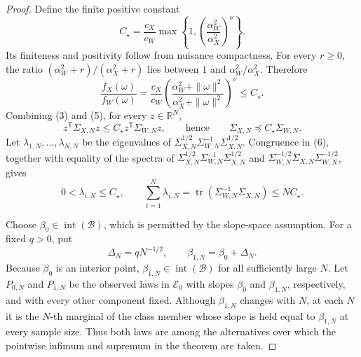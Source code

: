 \documentclass{article}
\begin{document}
\begin{proof}
Define the finite positive constant
\[
 C_\star=\frac{c_X}{c_W}
 \max\left\{1,\left(\frac{\alpha_W^2}{\alpha_X^2}\right)^\nu\right\}.
 \tag{4}
\]
Its finiteness and positivity follow from nuisance compactness.  For every \(r\geq0\), the ratio \((\alpha_W^2+r)/(\alpha_X^2+r)\) lies between \(1\) and \(\alpha_W^2/\alpha_X^2\).  Therefore
\[
 \frac{f_X(\omega)}{f_W(\omega)}
 =\frac{c_X}{c_W}
 \left(\frac{\alpha_W^2+\|\omega\|^2}
 {\alpha_X^2+\|\omega\|^2}\right)^\nu
 \leq C_\star.
 \tag{5}
\]
Combining (3) and (5), for every \(z\in\mathbb R^N\),
\[
 z^{\mathsf T}\Sigma_{X,N}z
 \leq C_\star z^{\mathsf T}\Sigma_{W,N}z,
 \qquad\text{hence}\qquad
 \Sigma_{X,N}\preceq C_\star\Sigma_{W,N}.
 \tag{6}
\]
Let \(\lambda_{1,N},\ldots,\lambda_{N,N}\) be the eigenvalues of \(\Sigma_{X,N}^{1/2}\Sigma_{W,N}^{-1}\Sigma_{X,N}^{1/2}\).  Congruence in (6), together with equality of the spectra of \(\Sigma_{X,N}^{1/2}\Sigma_{W,N}^{-1}\Sigma_{X,N}^{1/2}\) and \(\Sigma_{W,N}^{-1/2}\Sigma_{X,N}\Sigma_{W,N}^{-1/2}\), gives
\[
 0<\lambda_{i,N}\leq C_\star,
 \qquad
 \sum_{i=1}^N\lambda_{i,N}
 =\operatorname{tr}(\Sigma_{W,N}^{-1}\Sigma_{X,N})
 \leq NC_\star.
 \tag{7}
\]

Choose \(\beta_0\in\operatorname{int}(\mathcal B)\), which is permitted by the slope-space assumption.  For a fixed \(q>0\), put
\[
 \Delta_N=qN^{-1/2},
 \qquad
 \beta_{1,N}=\beta_0+\Delta_N.
 \tag{8}
\]
Because \(\beta_0\) is an interior point, \(\beta_{1,N}\in\operatorname{int}(\mathcal B)\) for all sufficiently large \(N\).  Let \(P_{0,N}\) and \(P_{1,N}\) be the observed laws in \(\mathcal E_0\) with slopes \(\beta_0\) and \(\beta_{1,N}\), respectively, and with every other component fixed.  Although \(\beta_{1,N}\) changes with \(N\), at each \(N\) it is the \(N\)-th marginal of the class member whose slope is held equal to \(\beta_{1,N}\) at every sample size.  Thus both laws are among the alternatives over which the pointwise infimum and supremum in the theorem are taken.


\end{proof}
\end{document}
